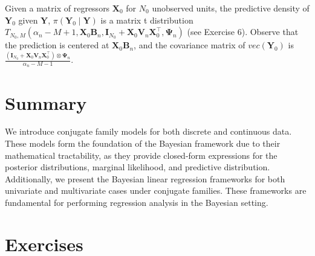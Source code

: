 Given a matrix of regressors ${\bm{X}}_0$ for $N_0$ unobserved units, the predictive density of ${\bm{Y}}_0$ given ${\bm{Y}}$, $\pi({\bm{Y}}_0\mid {\bm{Y}})$ is a matrix t distribution $T_{N_0,M}(\alpha_n-M+1,{\bm{X}}_0{\bm{B}}_n,{\bm{I}}_{N_0}+{\bm{X}}_0{\bm{V}}_n{\bm{X}}_0^{\top},{\bm{\Psi}}_n)$ (see Exercise 6). Observe that the prediction is centered at ${\bm{X}}_0{\bm{B}}_n$, and the covariance matrix of $vec({\bm{Y}}_0)$ is $\frac{({\bm{I}}_{N_0}+{\bm{X}}_0{\bm{V}}_n{\bm{X}}_0^{\top})\otimes{\bm{\Psi}}_n}{\alpha_n-M-1}$.  

\section{Summary}\label{sec45}
We introduce conjugate family models for both discrete and continuous data. These models form the foundation of the Bayesian framework due to their mathematical tractability, as they provide closed-form expressions for the posterior distributions, marginal likelihood, and predictive distribution. Additionally, we present the Bayesian linear regression frameworks for both univariate and multivariate cases under conjugate families. These frameworks are fundamental for performing regression analysis in the Bayesian setting.

\section{Exercises}\label{sec46}

